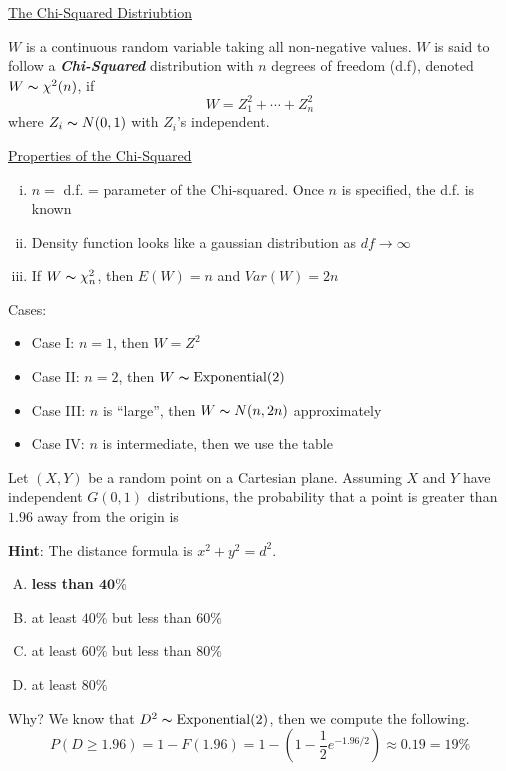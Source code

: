 \underline{The Chi-Squared Distriubtion}
\begin{defbox}
    \begin{definition}
        $ W $ is a continuous random variable taking all non-negative values.
        $ W $ is said to follow a \textbf{\emph{Chi-Squared}} distribution
        with $ n $ degrees of freedom (d.f), denoted $ W \thicksim \chi^2(n) $,
        if
        \[ W=Z_1^2+\cdots+Z_n^2 \]
        where $ Z_i \thicksim N(0,1) $ with $ Z_i $'s independent.
    \end{definition}
\end{defbox}
\underline{Properties of the Chi-Squared}
\begin{enumerate}[(i)]
    \item $ n= $ d.f. = parameter of the Chi-squared. Once $ n $ is specified, the d.f. is known
    \item Density function looks like a gaussian distribution as $ df\rightarrow\infty $
    \item If $ W \thicksim \chi^2_n $, then $ E(W)=n $ and $ Var(W)=2n $
\end{enumerate}
Cases:
\begin{itemize}
    \item Case I: $ n=1 $, then $ W=Z^2 $
    \item Case II: $ n=2 $, then $ W \thicksim \operatorname{Exponential}(2) $
    \item Case III: $ n $ is ``large'', then $ W \thicksim N(n,2n) $ approximately
    \item Case IV: $ n $ is intermediate, then we use the table
\end{itemize}

Let $ (X,Y) $ be a random point on a Cartesian plane. Assuming $ X $ and $ Y $
have independent $ G(0,1) $ distributions, the probability that a point is greater
than $ 1.96 $ away from the origin is

\textbf{Hint}: The distance formula is $ x^2+y^2=d^2 $.
\begin{enumerate}[(A)]
    \item \textbf{less than $ \bm{40\%} $}
    \item at least $ 40\% $ but less than $ 60\% $
    \item at least $ 60\% $ but less than $ 80\% $
    \item at least $ 80\% $
\end{enumerate}
Why? We know that $ D^2 \thicksim \operatorname{Exponential}(2) $, then we compute the following.
\[ P(D\geqslant 1.96)=1-F(1.96)=1-\left( 1-\frac{1}{2} e^{-1.96/2} \right)\approx 0.19=19\% \]

